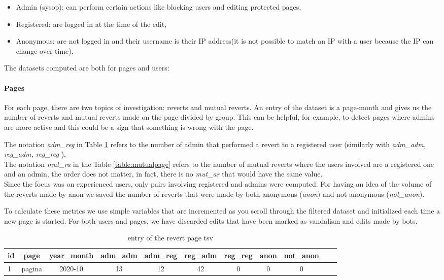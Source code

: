 \begin{itemize}
    \item Admin (sysop): can perform certain actions like blocking users and editing protected pages, 
    \item Registered: are logged in at the time of the edit, 
    \item Anonymous: are not logged in and their username is their IP address(it is not possible to match an IP with a user
        because the IP can change over time).
\end{itemize}

The datasets computed are both for pages and users: 
\paragraph*{Pages} 
For each page, there are two topics of investigation: reverts and mutual reverts. An entry of the
dataset is a page-month and gives us the number of reverts and mutual reverts made on the page
divided by group. This can be helpful, for example, to detect pages where admins are more active and
this could be a sign that something is wrong with the page.



The notation \textit{adm\_reg} in Table \ref{table:revertpage} refers to the number of admin that performed a
revert to a registered user (similarly with \textit{adm\_adm, reg\_adm, reg\_reg} ).\\

The notation \textit{mut\_ra} in the Table \ref{table:mutualpage} refers to the number of mutual reverts
where the users involved are a registered one and an admin, the order does not matter, in fact, there is
no \textit{mut\_ar} that would have the same value.\\


Since the focus was on experienced users, only pairs involving registered and admins were computed.
For having an idea of the volume of the reverts made by anon we saved the number of reverts
that were made by both anonymous (\textit{anon}) and not anonymous (\textit{not\_anon}).

To calculate these metrics we use simple variables that are incremented as you scroll through the filtered dataset
and initialized each time a new page is started. For both users and pages, we have discarded
edits that have been marked as vandalism and edits made by bots.

\begin{table}[H]
    \centering
    \begin{tabularx}{\columnwidth}{@{}Xcccccccccc@{}}
        \midrule
        \textbf{id} & \textbf{page} & \textbf{year\_month} & \textbf{adm\_adm} & \textbf{adm\_reg} & \textbf{reg\_adm} & \textbf{reg\_reg} & \textbf{anon} & \textbf{not\_anon}\\ \toprule
        1 & pagina & 2020-10 & 13 & 12 & 42 & 0 & 0 & 0 \\
        
         \bottomrule
    \end{tabularx}
    
    \caption{entry of the revert page tsv \label{table:revertpage}}
\end{table}

